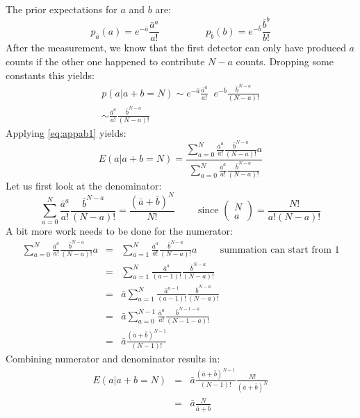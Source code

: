 The prior expectations for $a$ and $b$ are:
\begin{equation}
  p_{\bar{a}}(a) = e^{-\bar{a}} \frac{\bar{a}^a}{a!} \hspace{2cm}
  p_{\bar{b}}(b) = e^{-\bar{b}} \frac{\bar{b}^b}{b!}
\end{equation}
After the measurement, we know that the first detector can only have produced
$a$ counts if the other one happened to contribute $N-a$ counts. Dropping some
constants this yields:
\begin{eqnarray}
  p(a | a + b = N) \sim e^{-\bar{a}} \frac{\bar{a}^a}{a!} \;\;
                        e^{-\bar{b}} \frac{\bar{b}^{N-a}}{(N-a)!}\\
    \sim \frac{\bar{a}^a}{a!} \frac{\bar{b}^{N-a}}{(N-a)!}
\end{eqnarray}
Applying \ref{eq:appab1} yields:
\begin{equation}
  E(a | a+b=N)
  = \frac{\sum_{a=0}^N \frac{\bar{a}^a}{a!} \frac{\bar{b}^{N-a}}{(N-a)!} a}
         {\sum_{a=0}^N \frac{\bar{a}^a}{a!} \frac{\bar{b}^{N-a}}{(N-a)!}}
\end{equation}
Let us first look at the denominator:
\begin{equation}
  \sum_{a=0}^N \frac{\bar{a}^a}{a!} \frac{\bar{b}^{N-a}}{(N-a)!}
  = \frac{(\bar{a} + \bar{b})^N}{N!}
\hspace{1cm} \mbox{since } \left( \begin{array}{cc} N\\a \end{array}\right)
   = \frac{N!}{a! (N-a)!}
\end{equation}
A bit more work needs to be done for the numerator:
\begin{eqnarray}
 \sum_{a=0}^N \frac{\bar{a}^a}{a!} \frac{\bar{b}^{N-a}}{(N-a)!} a
  & = & \sum_{a=1}^N \frac{\bar{a}^a}{a!} \frac{\bar{b}^{N-a}}{(N-a)!} a
    \hspace{1cm} \mbox{summation can start from 1}\\
  & = & \sum_{a=1}^N \frac{\bar{a}^a}{(a-1)!} \frac{\bar{b}^{N-a}}{(N-a)!}\\
  & = & \bar{a} \sum_{a=1}^N \frac{\bar{a}^{a-1}}{(a-1)!}
                             \frac{\bar{b}^{N-a}}{(N-a)!}\\
  & = & \bar{a} \sum_{a=0}^{N-1} \frac{\bar{a}^a}{a!} 
                                 \frac{\bar{b}^{N-1-a}}{(N-1-a)!}\\
  & = & \bar{a} \frac{(\bar{a} + \bar{b})^{N-1}}{(N-1)!}
\end{eqnarray}
Combining numerator and denominator results in:
\begin{eqnarray}
  E(a | a+b=N) & = & \bar{a} \frac{(\bar{a} + \bar{b})^{N-1}}{(N-1)!}
                     \frac{N!}{(\bar{a} + \bar{b})^N}\\
  & = & \bar{a} \frac{N}{\bar{a} + \bar{b}}
\end{eqnarray}

